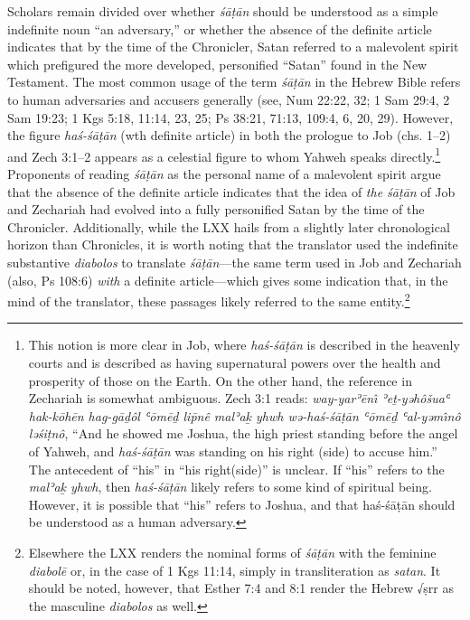 Scholars remain divided over whether \emph{śāṭān} should be understood
as a simple indefinite noun ``an adversary,''
\autocites{stokes_jbl2009}[114--117]{japhet2009}[370--390]{japhet1993}
or whether the absence of the definite article indicates that by the
time of the Chronicler, Satan referred to a malevolent spirit which
prefigured the more developed, personified ``Satan'' found in the New
Testament.\autocite[4--5]{rollston_keith-stuckenbruck2016} The most
common usage of the term \emph{śāṭān} in the Hebrew Bible refers to
human adversaries and accusers generally (see, Num 22:22, 32; 1 Sam
29:4, 2 Sam 19:23; 1 Kgs 5:18, 11:14, 23, 25; Ps 38:21, 71:13, 109:4, 6,
20, 29). However, the figure \emph{haś-śāṭān} (wth definite article) in
both the prologue to Job (chs. 1--2) and Zech 3:1--2 appears as a
celestial figure to whom Yahweh speaks directly.\footnote{This notion is
  more clear in Job, where \emph{haś-śāṭān} is described in the heavenly
  courts and is described as having supernatural powers over the health
  and prosperity of those on the Earth. On the other hand, the reference
  in Zechariah is somewhat ambiguous. Zech 3:1 reads: \emph{way-yarʾēnı̂
  ʾeṯ-yəhôšuaʿ hak-kōhēn hag-gāḏôl ʿōmēḏ lip̄nê malʾaḵ yhwh wə-haś-śāṭān
  ʿōmēḏ ʿal-yəmı̂nô ləśiṭnô}, ``And he showed me Joshua, the high priest
  standing before the angel of Yahweh, and \emph{haś-śāṭān} was standing
  on his right (side) to accuse him.'' The antecedent of ``his'' in
  ``his right(side)'' is unclear. If ``his'' refers to the \emph{malʾaḵ
  yhwh}, then \emph{haś-śāṭān} likely refers to some kind of spiritual
  being. However, it is possible that ``his'' refers to Joshua, and that
  haś-śāṭān should be understood as a human adversary.} Proponents of
reading \emph{śāṭān} as the personal name of a malevolent spirit argue
that the absence of the definite article indicates that the idea of
\emph{the śāṭān} of Job and Zechariah had evolved into a fully
personified Satan by the time of the
Chronicler.\autocites[216--217]{braun1986}[107]{coggins1976}[Rollston
also finds this reading compelling, though, not without difficulties.
See,][4--5]{rollston_keith-stuckenbruck2016} Additionally, while the LXX
hails from a slightly later chronological horizon than Chronicles, it is
worth noting that the translator used the indefinite substantive
\emph{diabolos} to translate \emph{śāṭān}---the same term used in Job
and Zechariah (also, Ps 108:6) \emph{with} a definite article---which
gives some indication that, in the mind of the translator, these
passages likely referred to the same entity.\footnote{Elsewhere the LXX
  renders the nominal forms of \emph{śāṭān} with the feminine
  \emph{diabolē} or, in the case of 1 Kgs 11:14, simply in
  transliteration as \emph{satan}. It should be noted, however, that
  Esther 7:4 and 8:1 render the Hebrew √ṣrr as the masculine
  \emph{diabolos} as well.}

